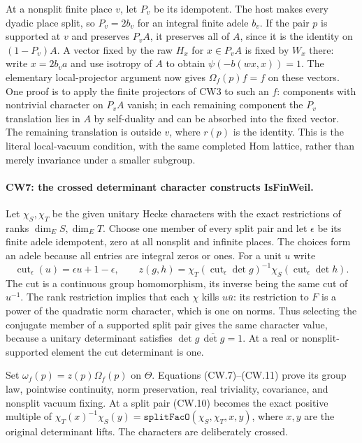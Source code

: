 At a nonsplit finite place $v$, let $P_v$ be its idempotent.
The host makes every dyadic place split, so $P_v=2b_v$ for an
integral finite adele $b_v$.  If the pair $p$ is supported at $v$
and preserves $P_vA$, it preserves all of $A$, since it is the
identity on $(1-P_v)A$.  A vector fixed by the raw $H_x$ for
$x\in P_vA$ is fixed by $W_x$ there: write $x=2b_va$ and use
isotropy of $A$ to obtain $\psi(-b(wx,x))=1$.  The elementary
local-projector argument now gives $\Omega_f(p)f=f$ on these
vectors.  One proof is to apply the finite projectors of CW3 to
such an $f$: components with nontrivial character on $P_vA$ vanish;
in each remaining component the $P_v$ translation lies in $A$ by
self-duality and can be absorbed into the fixed vector.  The
remaining translation is outside $v$, where $r(p)$ is the identity.
This is the literal local-vacuum condition, with the same completed
Hom lattice, rather than merely invariance under a smaller subgroup.

\paragraph{CW7: the crossed determinant character constructs IsFinWeil.}
Let $\chi_S,\chi_T$ be the given unitary Hecke characters with
the exact restrictions of ranks $\dim_E S,\dim_E T$.  Choose one
member of every split pair and let $\epsilon$ be its finite adele
idempotent, zero at all nonsplit and infinite places.  The choices
form an adele because all entries are integral zeros or ones.  For
a unit $u$ write
\[
 \operatorname{cut}_\epsilon(u)=\epsilon u+1-\epsilon,
 \qquad
 z(g,h)=\chi_T(\operatorname{cut}_\epsilon\det g)^{-1}
         \chi_S(\operatorname{cut}_\epsilon\det h).
                                                               \tag{CW.11}
\]
The cut is a continuous group homomorphism, its inverse being the
same cut of $u^{-1}$.  The rank restriction implies that each
$\chi$ kills $u\bar u$: its restriction to $F$ is a power of the
quadratic norm character, which is one on norms.  Thus selecting
the conjugate member of a supported split pair gives the same
character value, because a unitary determinant satisfies
$\det g\,\overline{\det g}=1$.  At a real or nonsplit-supported
element the cut determinant is one.

Set $\omega_f(p)=z(p)\Omega_f(p)$ on $\Theta$.  Equations
(CW.7)--(CW.11) prove its group law, pointwise continuity, norm
preservation, real triviality, covariance, and nonsplit vacuum
fixing.  At a split pair (CW.10) becomes the exact positive
multiple of
$\chi_T(x)^{-1}\chi_S(y)=\texttt{splitFacO}(\chi_S,\chi_T,x,y)$,
where $x,y$ are the original determinant lifts.  The characters are
deliberately crossed.

